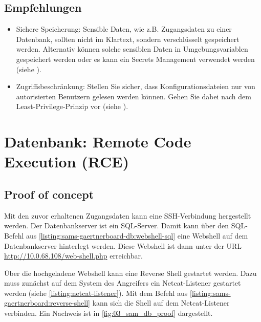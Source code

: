 \subsection*{Empfehlungen}
\begin{itemize}
    \item Sichere Speicherung: Sensible Daten, wie z.B. Zugangsdaten zu einer Datenbank, sollten nicht im Klartext, sondern verschlüsselt gespeichert werden. Alternativ können solche sensiblen Daten in Umgebungsvariablen gespeichert werden oder es kann ein Secrets Management verwendet werden (siehe \cite{owaspSecurityMisconfiguration}).
    \item Zugriffsbeschränkung: Stellen Sie sicher, dass Konfigurationsdateien nur von autorisierten Benutzern gelesen werden können. Gehen Sie dabei nach dem Least-Privilege-Prinzip vor (siehe \cite{owaspAuthenticationOWASP}).
\end{itemize}



\section{\makecvssbadge Datenbank: Remote Code Execution (RCE)}

\subsection*{Proof of concept}
Mit den zuvor erhaltenen Zugangsdaten kann eine SSH-Verbindung hergestellt werden. Der Datenbankserver ist ein SQL-Server. Damit kann über den SQL-Befehl aus \autoref{listing:sams-gaertnerboard-db:webshell-sql} eine Webshell auf dem Datenbankserver hinterlegt werden. Diese Webshell ist dann unter der URL \url{http://10.0.68.108/web-shell.php} erreichbar.

Über die hochgeladene Webshell kann eine Reverse Shell gestartet werden. Dazu muss zunächst auf dem System des Angreifers ein Netcat-Listener gestartet werden (siehe \autoref{listing:netcat-listener}). Mit dem Befehl aus \autoref{listing:sams-gaertnerboard:reverse-shell} kann sich die Shell auf dem Netcat-Listener verbinden. Ein Nachweis ist in \autoref{fig:03_sam_db_proof} dargestellt.

